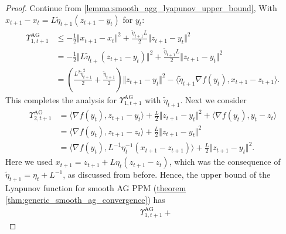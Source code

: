 \documentclass[12pt]{article}
\begin{document}
        \begin{proof}
            Continue from \ref*{lemma:smooth_agg_lyapunov_upper_bound}, With $x_{t +1} - x_t = L\tilde\eta_{t+1}(z_{t + 1} - y_t)$ for $y_t$: 
            \begin{align*}
                \Upsilon_{1, t + 1}^\text{AG} &\le 
                - \frac{1}{2}\Vert x_{t+1 } - x_t\Vert^2 + 
                \frac{\tilde\eta_{t +1}L}{2}\Vert z_{t+1} - y_t\Vert^2
                \\
                &= 
                - \frac{1}{2}\Vert L \tilde \eta_{t+} (z_{t+1} - y_t)\Vert^2 + 
                \frac{\tilde\eta_{t +1}L}{2}\Vert z_{t+1} - y_t\Vert^2
                \\
                &= 
                \left(
                    \frac{L^2\tilde\eta_{t + 1}^2}{2}
                    + 
                    \frac{\tilde \eta_{t +1}}{2}
                \right)
                \Vert z_{t+1} - y_t\Vert^2
                - 
                \langle 
                    \tilde \eta_{t+ 1} \nabla f(y_t), x_{t+1} - z_{t+1}
                \rangle. 
            \end{align*}
            This completes the analysis for $\Upsilon_{1, t + 1}^\text{AG}$ with $\tilde\eta_{t+1}$. 
            Next we consider 
            \begin{align*}
                \Upsilon_{2, t + 1}^{\text{AG}} &= 
                \langle \nabla f(y_t), z_{t+1} - y_t\rangle
                + 
                \frac{L }{2} \Vert z_{t+1} - y_t\Vert^2 + 
                \langle \nabla f(y_t), y_t - z_t\rangle
                \\
                &= 
                \langle \nabla f(y_t), z_{t + 1} - z_t\rangle
                + 
                \frac{L }{2} \Vert z_{t+1} - y_t\Vert^2
                \\
                &= 
                \langle \nabla f(y_t), L^{-1}\eta_t^{-1}(x_{t+1} - z_{t + 1})\rangle
                + \frac{L}{2}\Vert z_{t + 1} - y_t\Vert^2. 
            \end{align*}
            Here we used $x_{t + 1} = z_{t + 1} + L\eta_t (z_{t + 1} - z_t)$, which was the consequence of $\tilde\eta_{t + 1} = \eta_t + L^{-1}$, as discussed from before. 
            Hence, the upper bound of the Lyapunov function for smooth AG PPM 
            (\hyperref[thm:generic_smooth_ag_convergence]{theorem \ref*{thm:generic_smooth_ag_convergence}}) 
            has 
            \begin{align*}
                & \Upsilon_{1, t + 1}^{\text{AG}} + 

\end{align*}
\end{proof}
\end{document}
